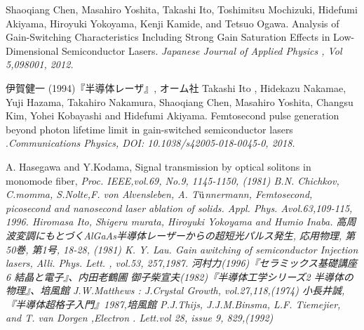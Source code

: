 \begin{thebibliography}{99}
 Shaoqiang Chen, Masahiro Yoshita, Takashi Ito, Toshimitsu Mochizuki, Hidefumi Akiyama, Hiroyuki Yokoyama, Kenji Kamide, and Tetsuo Ogawa. Analysis of Gain-Switching Characteristics Including Strong Gain Saturation Effects in Low-Dimensional Semiconductor Lasers. \sl Japanese Journal of Applied  Physics \rm , Vol 5,098001, 2012.

 伊賀健一 (1994)『半導体レーザ』, オーム社
Takashi Ito
, Hidekazu Nakamae, Yuji Hazama, Takahiro Nakamura, Shaoqiang Chen, Masahiro Yoshita, Changsu Kim, Yohei Kobayashi and Hidefumi Akiyama.
Femtosecond pulse generation beyond photon lifetime limit in gain-switched semiconductor lasers .\sl Communications Physics\rm , DOI: 10.1038/s42005-018-0045-0, 2018. 

 A. Hasegawa and Y.Kodama, Signal transmission by optical solitons in monomode fiber, \sl Proc. IEEE\rm ,vol.69, No.9, 1145-1150, (1981)
 B.N. Chichkov, C.momma, S.Nolte,F. von Alvensleben, A. T$\rm{\ddot{u}}$nnermann, Femtosecond, picosecond and nanosecond laser ablation of solids. \sl Appl. Phys. A\rm vol.63,109-115, 1996.
 Hiromasa Ito, Shigeru 
murata, Hiroyuki Yokoyama and Humio Inaba. 高周波変調にもとづくAlGaAs半導体レーザーからの超短光パルス発生, 応用物理, 第50巻, 第1号, 18-28, (1981)
 K. Y. Lau. Gain awitching of semiconductor Injection lasers, \sl Alli. Phys. Lett. \rm , vol.53, 257,1987.
河村力(1996)『セラミックス基礎講座6 結晶と電子』、内田老鶴圃
御子柴宣夫(1982)『半導体工学シリーズ2 半導体の物理』、培風館
 J.W.Matthews : J.Crystal Growth, vol.27,118,(1974)
小長井誠,『半導体超格子入門』1987,培風館
 P.J.Thijs, J.J.M.Binsma, L.F. Tiemejier, and T. van Dorgen ,\sl Electron . Lett.\rm vol 28, issue 9, 829,(1992)
\end{thebibliography}
